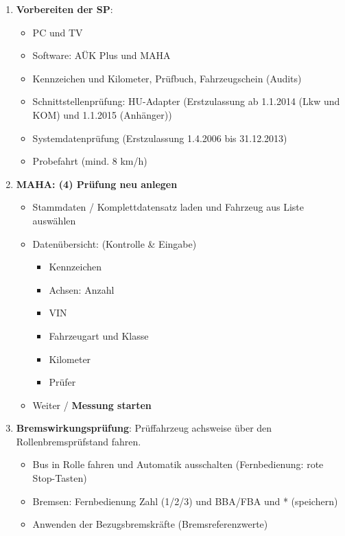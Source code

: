 \documentclass{vorlage-design-main}
\begin{document}
\begin{enumerate}
\def\labelenumi{\arabic{enumi}.}
\item
  \textbf{Vorbereiten der SP}:

  \begin{itemize}

  \item
    PC und TV
  \item
    Software: AÜK Plus und MAHA
  \item
    Kennzeichen und Kilometer, Prüfbuch, Fahrzeugschein (Audits)
  \item
    Schnittstellenprüfung: HU-Adapter (Erstzulassung ab 1.1.2014 (Lkw
    und KOM) und 1.1.2015 (Anhänger))
  \item
    Systemdatenprüfung (Erstzulassung 1.4.2006 bis 31.12.2013)
  \item
    Probefahrt (mind. 8 km/h)
  \end{itemize}
\item
  \textbf{MAHA: (4) Prüfung neu anlegen}

  \begin{itemize}

  \item
    Stammdaten / Komplettdatensatz laden und Fahrzeug aus Liste
    auswählen
  \item
    Datenübersicht: (Kontrolle \& Eingabe)

    \begin{itemize}

    \item
      Kennzeichen
    \item
      Achsen: Anzahl
    \item
      VIN
    \item
      Fahrzeugart und Klasse
    \item
      Kilometer
    \item
      Prüfer
    \end{itemize}
  \item
    Weiter / \textbf{Messung starten}
  \end{itemize}
\item
  \textbf{Bremswirkungsprüfung}: Prüffahrzeug achsweise über den
  Rollenbremsprüfstand fahren.

  \begin{itemize}

  \item
    Bus in Rolle fahren und Automatik ausschalten (Fernbedienung: rote
    Stop-Tasten)
  \item
    Bremsen: Fernbedienung Zahl (1/2/3) und BBA/FBA und * (speichern)
  \item
    Anwenden der Bezugsbremskräfte (Bremsreferenzwerte)


\end{itemize}
\end{enumerate}
\end{document}
